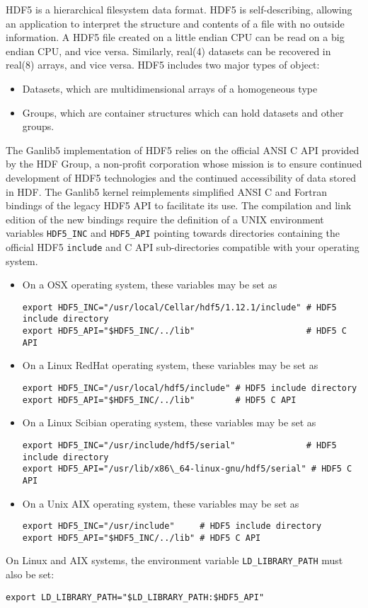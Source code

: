 HDF5 is a hierarchical filesystem data format. HDF5 is self-describing, allowing an application to interpret the structure and contents
of a file with no outside information. A HDF5 file created on a little endian CPU can be read on a big endian CPU, and vice versa.
Similarly, real(4) datasets can be recovered in real(8) arrays, and vice versa. HDF5 includes two major types of object:
\begin{itemize}
\item Datasets, which are multidimensional arrays of a homogeneous type
\item Groups, which are container structures which can hold datasets and other groups.
\end{itemize}
The Ganlib5 implementation of HDF5 relies on the official ANSI C API provided by the HDF Group, a non-profit corporation whose mission
is to ensure continued development of HDF5 technologies and the continued accessibility of data stored in HDF. The Ganlib5 kernel
reimplements simplified ANSI C and Fortran bindings of the legacy HDF5 API to facilitate its use. The compilation and link edition of the
new bindings require the definition of a UNIX environment variables {\tt HDF5\_INC} and {\tt HDF5\_API} pointing towards directories containing
the official HDF5 {\tt include} and C API sub-directories compatible with your operating system. 

\begin{itemize}
\item On a OSX operating system, these variables may be set as
\begin{verbatim}
export HDF5_INC="/usr/local/Cellar/hdf5/1.12.1/include" # HDF5 include directory
export HDF5_API="$HDF5_INC/../lib"                      # HDF5 C API
\end{verbatim}
\item On a Linux RedHat operating system, these variables may be set as
\begin{verbatim}
export HDF5_INC="/usr/local/hdf5/include" # HDF5 include directory
export HDF5_API="$HDF5_INC/../lib"        # HDF5 C API
\end{verbatim}
\item On a Linux Scibian operating system, these variables may be set as
\begin{verbatim}
export HDF5_INC="/usr/include/hdf5/serial"              # HDF5 include directory
export HDF5_API="/usr/lib/x86\_64-linux-gnu/hdf5/serial" # HDF5 C API
\end{verbatim}
\item On a Unix AIX operating system, these variables may be set as
\begin{verbatim}
export HDF5_INC="/usr/include"     # HDF5 include directory
export HDF5_API="$HDF5_INC/../lib" # HDF5 C API
\end{verbatim}
\end{itemize}
On Linux and AIX systems, the environment variable {\tt LD\_LIBRARY\_PATH} must also be set:
\begin{verbatim}
export LD_LIBRARY_PATH="$LD_LIBRARY_PATH:$HDF5_API"
\end{verbatim}

